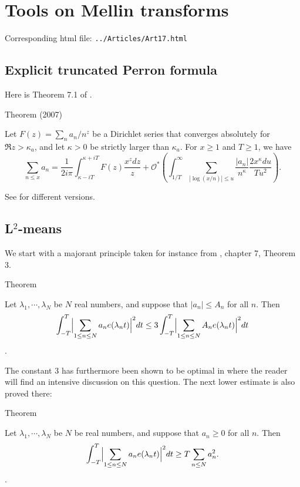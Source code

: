 \chapter{  Tools on Mellin transforms}

Corresponding html file: \texttt{../Articles/Art17.html}










\section{Explicit truncated Perron formula}



Here is Theorem 7.1 of
\cite{Ramare*07a}.

\par 
\begin{thm}{Theorem (2007)}

Let $F(z)=\sum_{n}a_n/n^z$ be a Dirichlet series that converges absolutely
  for $\Re z>\kappa_a$, and let $\kappa>0$ be strictly larger than 
  $\kappa_a$. For $x\ge1$ and $T\ge1$, we have
$$
    \sum_{n\le x}a_n
    =\frac1{2i\pi}\int_{\kappa-iT}^{\kappa+iT}F(z)\frac{x^zdz}z
    +\mathcal{O}^*\left(
      \int_{1/T}^{\infty}
      \sum_{|\log(x/n)|\le u}\frac{|a_n|}{n^\kappa}
      \frac{2x^\kappa du}{T u^2}
    \right).
$$
\end{thm}

See
\cite{Ramare*14-6}
for different versions.




\section{L${}^2$-means}


We start with a majorant principle taken for instance from
\cite{Montgomery*94},
chapter 7, Theorem 3.
\par 
\begin{thm}{Theorem}

  Let $\lambda_1,\cdots,\lambda_N$ be $N$ real numbers, and suppose
  that $|a_n|\le A_n$ for all $n$. Then
  $$
  \int_{-T}^T\Bigl|\sum_{1\le n\le N}a_n e(\lambda_n t)\Bigr|^2dt
  \le 3
  \int_{-T}^T\Bigl|\sum_{1\le n\le N}A_n e(\lambda_n t)\Bigr|^2dt
  $$.
\end{thm}

The constant 3 has furthermore been shown to be optimal in
\cite{Logan*88}
where the reader will find an intensive discussion on this
question. The next lower estimate is also proved there:
\par 
\begin{thm}{Theorem}

  Let $\lambda_1,\cdots,\lambda_N$ be $N$ be real numbers, and suppose
  that $a_n\ge 0$ for all $n$. Then
  $$
  \int_{-T}^T\Bigl|\sum_{1\le n\le N}a_n e(\lambda_n t)\Bigr|^2dt
  \ge
  T \sum_{n\le N}a_n^2.
  $$.
\end{thm}



